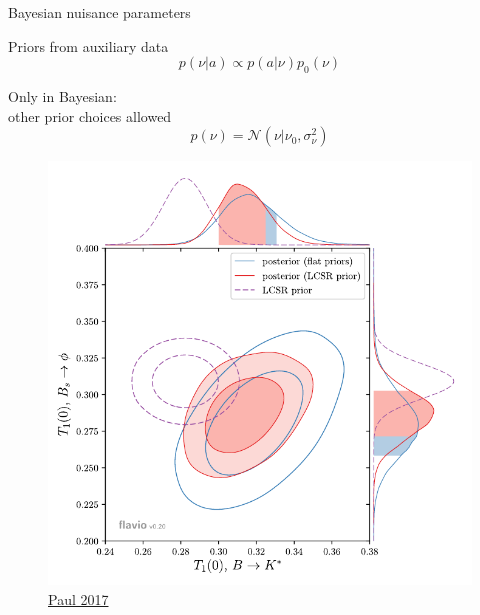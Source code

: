 \documentclass[
aspectratio=169,
14pt,
professionalfonts
]{beamer}
\begin{document}
\begin{frame}{Bayesian nuisance parameters}
    \begin{minipage}{0.6\textwidth}
        Priors from auxiliary data
        $$p(\nu|a) \propto p(a|\nu) p_0(\nu)$$
        
        Only in Bayesian:\\ other prior choices allowed
        $$ p(\nu) = \mathcal{N}(\nu | \nu_0, \sigma_\nu^2)$$
        
    \end{minipage}
    \begin{minipage}{0.39\textwidth}
        \begin{figure}
            \centering
            \includegraphics[width=\textwidth]{../plots/straub-posterior.pdf}
            \flushright \small
        \href{https://arxiv.org/pdf/2311.14647}{Paul 2017}
        \end{figure}
    \end{minipage}
\end{frame}
\end{document}
